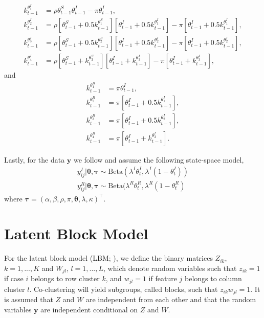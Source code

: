 \documentclass[10pt,a4paper]{article}
\begin{document}
\begin{equation*}
	\begin{split}	
		k_{t-1}^{\theta^I_1} &= \rho \theta_{t-1}^S \theta_{t-1}^I - \pi \theta^I_{t-1}, \\
		k_{t-1}^{\theta^I_2} &= \rho [\theta_{t-1}^S + 0.5 k_{t-1}^{\theta^S_1}] [\theta_{t-1}^I + 0.5 k_{t-1}^{\theta^I_1}] - \pi[\theta_{t-1}^I + 0.5 k_{t-1}^{\theta^I_1}], \\
		k_{t-1}^{\theta^I_3} &= \rho [\theta_{t-1}^S + 0.5 k_{t-1}^{\theta^S_2}] [\theta_{t-1}^I + 0.5 k_{t-1}^{\theta^I_2}] - \pi[\theta_{t-1}^I + 0.5 k_{t-1}^{\theta^I_2}], \\
		k_{t-1}^{\theta^I_4} &= \rho [\theta_{t-1}^S + k_{t-1}^{\theta^S_3}] [\theta_{t-1}^I + k_{t-1}^{\theta^I_3}] - \pi[\theta_{t-1}^I + k_{t-1}^{\theta^I_3}], 
	\end{split}
\end{equation*}
%
and 
%
\begin{equation*}
	\begin{split}	
		k_{t-1}^{\theta^R_1} &= \pi \theta^I_{t-1}, \\
		k_{t-1}^{\theta^R_2} &= \pi[\theta_{t-1}^I + 0.5 k_{t-1}^{\theta^I_1}], \\
		k_{t-1}^{\theta^R_3} &= \pi[\theta_{t-1}^I + 0.5 k_{t-1}^{\theta^I_2}], \\
		k_{t-1}^{\theta^R_4} &= \pi[\theta_{t-1}^I + k_{t-1}^{\theta^I_3}]. 
	\end{split}
\end{equation*}
%

Lastly, for the data $\mathbf{y}$  we follow \parencite{song2020epidemiological} and assume the following state-space model,  
%
\begin{equation}
\begin{aligned}
	y_{ij}^I | \boldsymbol{\theta}, \boldsymbol{\tau} \sim \text{Beta}(\lambda^I \theta_t^I, \lambda^I(1 - \theta_t^I)) \\
	y_{ij}^R | \boldsymbol{\theta}, \boldsymbol{\tau} \sim \text{Beta}(\lambda^R \theta_t^R, \lambda^R(1 - \theta_t^R)
\end{aligned}
\end{equation}
%
where 
%
$
\boldsymbol{\tau} = (\alpha, \beta, \rho, \pi, \mathbf{\theta}, \lambda, \kappa)^\top.
$
%
\section{Latent Block Model}
For the latent block model (LBM; \cite{govaert2003clustering}), we define the binary matrices $Z_{ik}$, $k = 1,..., K$ and $W_{jl}$, $l = 1,..., L$, which denote random variables such that $z_{ik} = 1$ if case $i$ belongs to row cluster $k$, and $w_{jl} = 1$ if feature $j$ belongs to column cluster $l$. Co-clustering will yield subgroups, called blocks, such that $z_{ik} w_{jl} = 1$. It is assumed that $Z$ and $W$ are independent from each other and that the random variables $\mathbf{y}$ are independent conditional on $Z$ and $W$.
\end{document}
